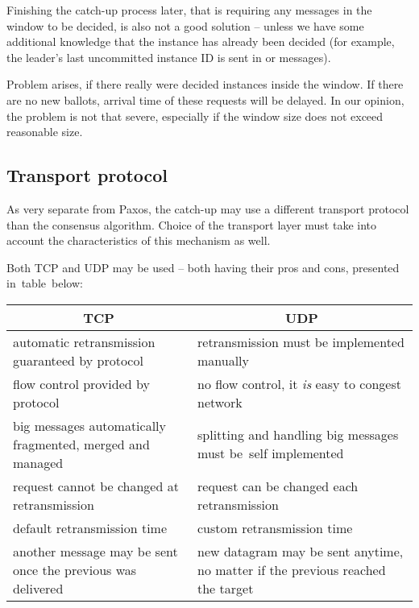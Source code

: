 Finishing the catch-up process later, that is requiring any messages in the window to be decided, is also not a good solution -- unless we have some additional knowledge that the instance has already been decided (for example, the leader's last uncommitted instance ID is sent in \propose or \alive messages).

Problem arises, if there really were decided instances inside the window. If there are no new ballots, arrival time of these requests will be delayed. In our opinion, the problem is not that severe, especially if the window size does not exceed reasonable size.

\subsection{Transport protocol}
\label{subsec:transport_protocole}
As very separate from Paxos, the catch-up may use a different transport protocol than the consensus algorithm.
Choice of the transport layer must take into account the characteristics of this mechanism as well.

Both TCP and UDP may be used -- both having their pros and cons, presented in~table~below:

\begin{center}
  \begin{tabular}{m{}|m{}}
    \multicolumn{1}{c|}{ \textbf{TCP} }                          & \multicolumn{1}{c}{ \textbf{UDP} } \\ \hline
    automatic retransmission guaranteed by protocol             & retransmission must be implemented manually \\
    flow control provided by protocol                           & no flow control, it \emph{is} easy to congest network \\
    big messages automatically fragmented, mer\-ged and managed & splitting and handling big messages must be~self implemented \\
    request cannot be changed at retransmission                 & request can be changed each retransmission \\
    default retransmission time                                 & custom retransmission time \\
    another message may be sent once the previous was delivered & new datagram may be sent anytime, no matter if the previous reached the target \\
  \end{tabular}
\end{center}

